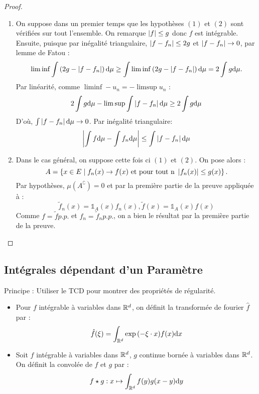 \documentclass{cours}
\begin{document}
    \begin{proof}
        \begin{enumerate}
            \item On suppose dans un premier temps que les hypothèses $(1)$ et $(2)$ sont vérifiées sur tout l'ensemble. On remarque $\left|f\right| \leq g$ donc $f$ est intégrable. \\
            Ensuite, puisque par inégalité triangulaire, $\left|f - f_{n}\right| \leq 2g$ et $\left|f - f_{n}\right| \to 0$, par lemme de Fatou : 
            \[
                \liminf \int \left(2g - \left|f - f_{n}\right|\right) \mathrm{d}\mu \geq \int \liminf \left(2g - \left|f - f_{n}\right|\right) \mathrm{d}\mu = 2 \int g \mathrm{d}\mu.
            \]
            Par linéarité, comme $\liminf -u_{n} = -\limsup u_{n}$ : 
            \[
                2 \int g \mathrm{d}\mu - \limsup \int \left|f - f_{n}\right| \mathrm{d}\mu \geq 2 \int g \mathrm{d}\mu
            \]
            D'où, $\int \left|f - f_{n}\right| \mathrm{d}\mu \to 0$. Par inégalité triangulaire: 
            \[
                \left|\int f \mathrm{d}\mu - \int f_{n}\mathrm{d}\mu\right| \leq \int \left|f - f_{n}\right| \mathrm{d}\mu
            \]
            \item Dans le cas général, on suppose cette fois ci $(1)$ et $(2)$. On pose alors : 
            \[
                A = \left\{x \in E \mid f_{n}(x) \to f(x) \text{ et pour tout n } \left|f_{n}(x)\right|\leq g(x)\right\}.
            \]
            Par hypothèses, $\mu\left(A^{\complement}\right) = 0$ et par la première partie de la preuve appliquée à : 
            \[
                \tilde{f}_{n}(x) = \mathds{1}_{A}(x)f_{n}(x),  \tilde{f}(x) = \mathds{1}_{A}(x)f(x)
            \]
            Comme $f = \tilde{f} p.p.$ et $f_{n} = \tilde{f}_{n} p.p.$, on a bien le résultat par la première partie de la preuve. 
        \end{enumerate}
    \end{proof}
    
    \subsection{Intégrales dépendant d'un Paramètre}
    Principe : Utiliser le TCD pour montrer des propriétés de régularité.
    \begin{remark}
        \begin{itemize}
            \item Pour $f$ intégrable à variables dans $\mathbb{R}^{d}$, on définit la transformée de fourier $\hat{f}$ par : \[   
                \hat{f}(\xi) = \int_{\mathbb{R}^{d}} \exp{\left(-\xi \cdot x\right)}f(x)\mathrm{d}x\]
            \item Soit $f$ intégrable à variables dans $\mathbb{R}^{d}$, $g$ continue bornée à variables dans $\mathbb{R}^{d}$. On définit la convolée de $f$ et $g$ par : 
            \[f \star g : x \mapsto \int_{\mathbb{R}^{d}} f(y)g(x - y)\mathrm{d}y \]
        \end{itemize}
    \end{remark}  
\end{document}
